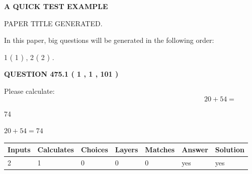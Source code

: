 \documentclass[12pt]{article}
\begin{document}
   
\vspace{0.2in}
   
   
   
   
   
   
   
   
 \vspace{0.2in}
{\LARGE {\textbf{ A QUICK TEST EXAMPLE}}}
   
   
 PAPER TITLE GENERATED.
   
   
   
\vspace{0.2in}
   
In this paper, big questions will be generated in the following order: 
   
   
   1 ( 1 )
 ,
   2 ( 2 )
 .
  
\vspace{0.2in}
  
{\textbf{\Large{QUESTION
475.1 
 ( 1 , 1 , 101 )
}}}
  
  
 
Please calculate:
\begin{equation}
20 +  %
54 = \nonumber
\end{equation}
 
 
 
\noindent{}
 
 

74
 
 
\noindent{}
 
 

 
 
 
\noindent{}
 
 

$ %
20 +  %
54=   %
74$
 
 
\noindent{}
 
 

 
   
   
   
   
\noindent\begin{tabular}{|l|l|l|l|l|l|l|}
 \hline
Inputs & Calculates & Choices & Layers & Matches & Answer & Solution \\ \hline
 2  & 
 1  & 
 0
  & 
 0  & 
 0  & 
  yes & 
  yes 
  \\ \hline
 \end{tabular}
   
\end{document}
